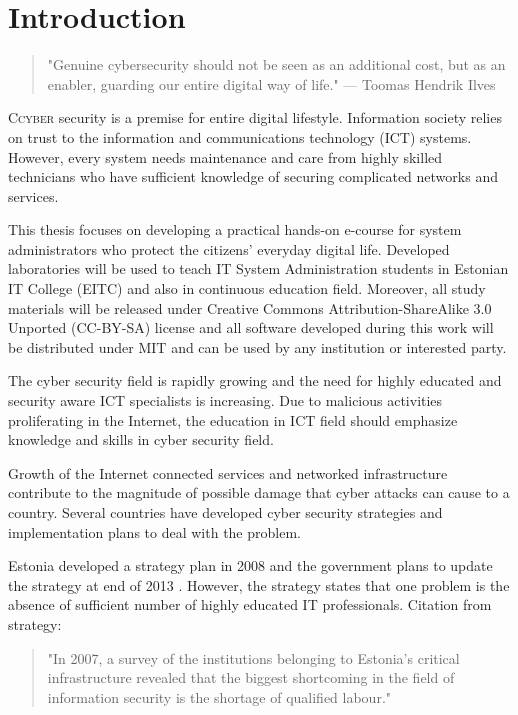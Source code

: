 \chapter{Introduction}
\label{Introduction}

 
\begin{quote}
"Genuine cybersecurity should not be seen as an additional cost, but as an enabler, guarding our entire digital way of life." --- Toomas Hendrik Ilves
\end{quote}

\lettrine[lraise=0.1, nindent=0em, slope=-.5em]{\color{Violet}C}{cyber} security is a premise for entire digital lifestyle. Information society relies on trust to the information and communications technology (\gls{ICT}) systems. However, every system needs maintenance and care from highly skilled technicians who have sufficient knowledge of securing complicated networks and services. 

This thesis focuses on developing a practical hands-on e-course for system administrators who protect the citizens' everyday digital life. Developed laboratories will be used to teach IT System Administration students in Estonian IT College (\gls{EITC}) and also in continuous education field. Moreover, all study materials will be released under Creative Commons Attribution-ShareAlike 3.0 Unported  (\gls{CC-BY-SA}) license and all software developed during this work will be distributed under \gls{MIT} and can be used by any institution or interested party.

The cyber security field is rapidly growing and the need for highly educated and security aware \gls{ICT} specialists is increasing. Due to  malicious activities proliferating in the Internet, the education in \gls{ICT} field should emphasize knowledge and skills in cyber security field.

Growth of the Internet connected services and networked infrastructure contribute to the magnitude of possible damage that cyber attacks can cause to a country. Several countries have developed cyber security strategies and implementation plans to deal with the problem.

Estonia developed a strategy plan in 2008 \citep{Strategy2008} and the government plans to update the strategy at end of 2013 \citep{StrategyProposal2013}. However, the strategy states that one problem is the absence of sufficient number of highly educated IT professionals. Citation from strategy:  
\begin{quote}
"In 2007, a survey of the institutions belonging to Estonia’s critical infrastructure revealed that the biggest shortcoming in the field of information security is the shortage of qualified labour." \citep[p.~16]{Strategy2008}
\end{quote}

